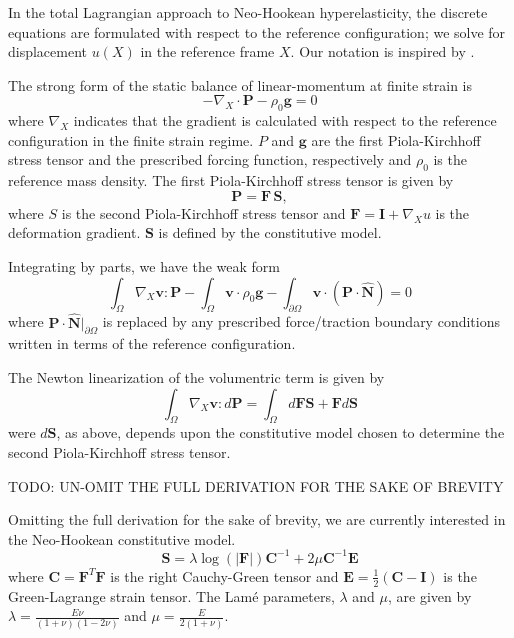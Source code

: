 In the total Lagrangian approach to Neo-Hookean hyperelasticity, the discrete equations are formulated with respect to the reference configuration; we solve for displacement $u \left( X \right)$ in the reference frame $X$.
Our notation is inspired by \cite{holzapfel2000nonlinear}.

The strong form of the static balance of linear-momentum at finite strain is
\begin{equation}
- \nabla_X \cdot \boldsymbol{P} - \rho_0 \boldsymbol{g} = 0
\label{finite_strong}
\end{equation}
where $\nabla_X$ indicates that the gradient is calculated with respect to the reference configuration in the finite strain regime.
$P$ and $\boldsymbol{g}$ are the first Piola-Kirchhoff stress tensor and the prescribed forcing function, respectively and $\rho_0$ is the reference mass density.
The first Piola-Kirchhoff stress tensor is given by
\begin{equation}
\boldsymbol{P} = \boldsymbol{F} \, \boldsymbol{S},
\label{first_pk}
\end{equation}
where $S$ is the second Piola-Kirchhoff stress tensor and $\boldsymbol{F} = \boldsymbol{I} + \nabla_X u$ is the deformation gradient.
$\boldsymbol{S}$ is defined by the constitutive model.

Integrating by parts, we have the weak form
\begin{equation}
\int_{\Omega}{\nabla_X \boldsymbol{v} \colon \boldsymbol{P}} - \int_{\Omega}{\boldsymbol{v} \cdot \rho_0 \boldsymbol{g}} - \int_{\partial \Omega}{\boldsymbol{v} \cdot (\boldsymbol{P} \cdot \hat{\boldsymbol{N}})} = 0
\label{finite_weak}
\end{equation}
where $\boldsymbol{P} \cdot \hat{\boldsymbol{N}}|_{\partial\Omega}$ is replaced by any prescribed force/traction boundary conditions written in terms of the reference configuration.

The Newton linearization of the volumentric term is given by
\begin{equation}
\int_{\Omega}{\nabla_X \boldsymbol{v} : d \boldsymbol{P}} = \int_{\Omega} d \boldsymbol{F} \boldsymbol{S} + \boldsymbol{F} d \boldsymbol{S}
\label{finite_weak_linear}
\end{equation}
were $d \boldsymbol{S}$, as above, depends upon the constitutive model chosen to determine the second Piola-Kirchhoff stress tensor.

TODO: UN-OMIT THE FULL DERIVATION FOR THE SAKE OF BREVITY

Omitting the full derivation for the sake of brevity, we are currently interested in the Neo-Hookean constitutive model.
\begin{equation}
\boldsymbol{S} = \lambda \log \left( \lvert \boldsymbol{F} \rvert \right) \boldsymbol{C}^{-1} + 2 \mu \boldsymbol{C}^{-1} \boldsymbol{E}
\label{constitutive}
\end{equation}
where $\boldsymbol{C} = \boldsymbol{F}^T \boldsymbol{F}$ is the right Cauchy-Green tensor and $\boldsymbol{E} = \frac{1}{2} \left( \boldsymbol{C} - \boldsymbol{I} \right)$ is the Green-Lagrange strain tensor.
The Lam{\'e} parameters, $\lambda$ and $\mu$, are given by $\lambda = \frac{E \nu}{\left( 1 + \nu \right)\left( 1 - 2 \nu \right)}$ and $\mu = \frac{E}{2 \left( 1 + \nu \right)}$.

